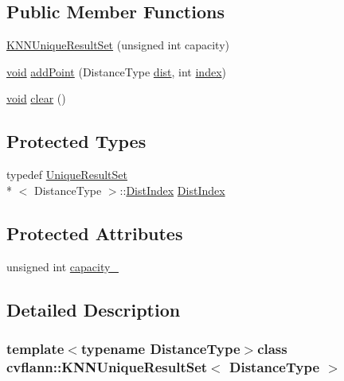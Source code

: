 \subsection*{Public Member Functions}
\begin{DoxyCompactItemize}
\item 
\hyperlink{classcvflann_1_1KNNUniqueResultSet_a9fc19d69ea8ecbb9b9c995499d910dd1}{K\-N\-N\-Unique\-Result\-Set} (unsigned int capacity)
\item 
\hyperlink{legacy_8hpp_a8bb47f092d473522721002c86c13b94e}{void} \hyperlink{classcvflann_1_1KNNUniqueResultSet_a58c7be4d3db34824c1e8406ca22215d7}{add\-Point} (Distance\-Type \hyperlink{legacy_8hpp_ae895c2003a87eda49126845b7ac3688e}{dist}, int \hyperlink{core__c_8h_a750b5d744c39a06bfb13e6eb010e35d0}{index})
\item 
\hyperlink{legacy_8hpp_a8bb47f092d473522721002c86c13b94e}{void} \hyperlink{classcvflann_1_1KNNUniqueResultSet_afcf19c6a201b4580983b6baaae0a8383}{clear} ()
\end{DoxyCompactItemize}
\subsection*{Protected Types}
\begin{DoxyCompactItemize}
\item 
typedef \hyperlink{classcvflann_1_1UniqueResultSet}{Unique\-Result\-Set}\\*
$<$ Distance\-Type $>$\-::\hyperlink{classcvflann_1_1KNNUniqueResultSet_aace6ad174a9fa6ac070ab7217612bf64}{Dist\-Index} \hyperlink{classcvflann_1_1KNNUniqueResultSet_aace6ad174a9fa6ac070ab7217612bf64}{Dist\-Index}
\end{DoxyCompactItemize}
\subsection*{Protected Attributes}
\begin{DoxyCompactItemize}
\item 
unsigned int \hyperlink{classcvflann_1_1KNNUniqueResultSet_ab29fdc339d19bb704764ad2a1fa22e80}{capacity\-\_\-}
\end{DoxyCompactItemize}


\subsection{Detailed Description}
\subsubsection*{template$<$typename Distance\-Type$>$class cvflann\-::\-K\-N\-N\-Unique\-Result\-Set$<$ Distance\-Type $>$}

